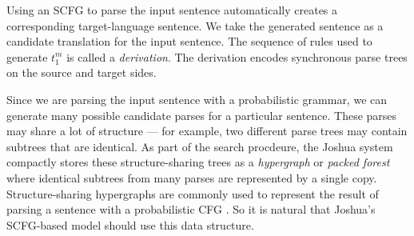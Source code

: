 \documentclass[nologo]{pbml}
\begin{document}
Using an SCFG to parse the input sentence automatically creates a corresponding target-language sentence.
We take the generated sentence as a candidate translation for the
input sentence. The sequence of rules used to generate $t_1^m$ is
called a {\it derivation}. The derivation encodes synchronous parse trees on
the source and target sides.



Since we are parsing the input sentence with a probabilistic grammar, we can
generate many possible candidate parses for a particular sentence. These parses
may share a lot of structure --- for example, two different parse trees may
contain subtrees that are identical. 
As part of the search procdeure, the Joshua system compactly stores 
these structure-sharing
trees as a {\em hypergraph} or {\em packed forest} where identical subtrees
from many parses are represented by a single copy.
Structure-sharing hypergraphs are commonly used to represent the result of
parsing a sentence with a probabilistic CFG \cite{billott-lang:1989:ACL,Klein2001}.
So it is natural that Joshua's
SCFG-based model should use this data structure.
\end{document}
